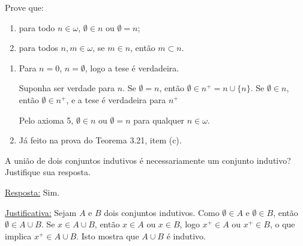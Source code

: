 \begin{exercicio}
	Prove que:
	\begin{enumerate}[label=(\alph{*})]
		\item para todo $n\in\omega$, $\emptyset\in n$ ou $\emptyset=n$;
		\item para todos $n,m\in\omega$, se $m\in n$, então $m\subset n$.
	\end{enumerate}
\end{exercicio}

\begin{enumerate}[label=(\alph{*})]
	\item Para $n=0$, $n=\emptyset$, logo a tese é verdadeira.
	
	Suponha ser verdade para $n$. Se $\emptyset=n$, então $\emptyset\in n^+=n\cup\{n\}$. Se $\emptyset\in n$, então $\emptyset\in n^+$, e a tese é verdadeira para $n^+$
	
	Pelo axioma 5, $\emptyset\in n$ ou $\emptyset=n$ para qualquer $n\in\omega$.
	\item Já feito na prova do Teorema 3.21, item (c).
\end{enumerate}


\begin{exercicio}
	A união de dois conjuntos indutivos é necessariamente um conjunto indutivo? Justifique sua resposta.
\end{exercicio}
\begin{solucao}
	
	\underline{Resposta:} Sim.
	
	\underline{Justificativa:} Sejam $A$ e $B$ dois conjuntos indutivos. Como $\emptyset\in A$ e $\emptyset\in B$, então $\emptyset\in A\cup B$. Se $x\in A\cup B$, então $x\in A$ ou $x\in B$, logo $x^+\in A$ ou $x^+\in B$, o que implica $x^+\in A\cup B$. Isto mostra que $A\cup B$ é indutivo.
\end{solucao}